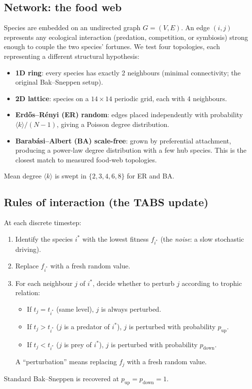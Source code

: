 \documentclass[10pt,a4paper,twocolumn]{article}
\begin{document}
\subsection{Network: the food web}
Species are embedded on an undirected graph $G = (V,E)$. An edge $(i,j)$ represents any ecological interaction (predation, competition, or symbiosis) strong enough to couple the two species' fortunes. We test four topologies, each representing a different structural hypothesis:
\begin{itemize}
\item \textbf{1D ring}: every species has exactly 2 neighbours (minimal connectivity; the original Bak--Sneppen setup).
\item \textbf{2D lattice}: species on a $14 \times 14$ periodic grid, each with 4 neighbours.
\item \textbf{Erd\H{o}s--R\'enyi (ER) random}: edges placed independently with probability $\langle k \rangle / (N{-}1)$, giving a Poisson degree distribution.
\item \textbf{Barab\'asi--Albert (BA) scale-free}: grown by preferential attachment, producing a power-law degree distribution with a few hub species. This is the closest match to measured food-web topologies.
\end{itemize}
Mean degree $\langle k \rangle$ is swept in $\{2,3,4,6,8\}$ for ER and BA.

\subsection{Rules of interaction (the TABS update)}
At each discrete timestep:
\begin{enumerate}
\item Identify the species $i^*$ with the lowest fitness $f_{i^*}$ (the \emph{noise}: a slow stochastic driving).
\item Replace $f_{i^*}$ with a fresh random value.
\item For each neighbour $j$ of $i^*$, decide whether to perturb $j$ according to trophic relation:
\begin{itemize}
\item If $t_j = t_{i^*}$ (same level), $j$ is always perturbed.
\item If $t_j > t_{i^*}$ ($j$ is a predator of $i^*$), $j$ is perturbed with probability $p_{\text{up}}$.
\item If $t_j < t_{i^*}$ ($j$ is prey of $i^*$), $j$ is perturbed with probability $p_{\text{down}}$.
\end{itemize}
A ``perturbation'' means replacing $f_j$ with a fresh random value.
\end{enumerate}
Standard Bak--Sneppen is recovered at $p_{\text{up}} = p_{\text{down}} = 1$.
\end{document}
